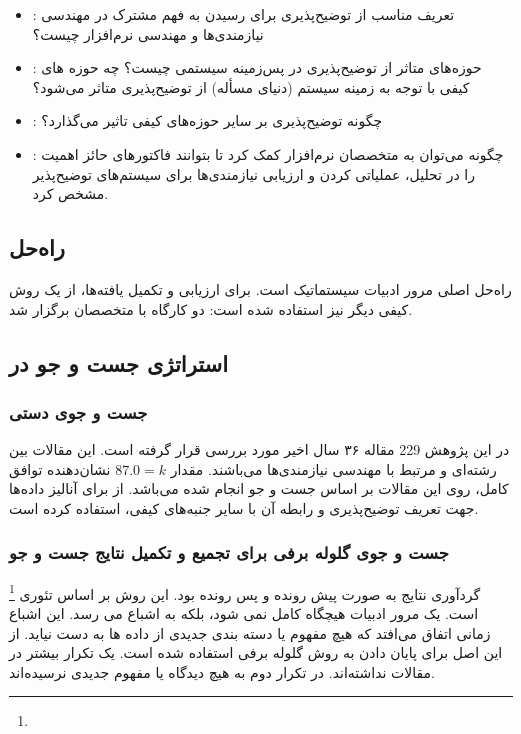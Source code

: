 \begin{itemize}
    \item {}: تعریف مناسب از توضیح‌پذیری برای رسیدن به فهم مشترک در مهندسی
    نیازمندی‌ها و مهندسی نرم‌افزار چیست؟
    \item {}: حوزه‌های متاثر از توضیح‌پذیری در پس‌زمینه سیستمی چیست؟ چه
    حوزه های کیفی با توجه به زمینه سیستم (دنیای مسأله) از توضیح‌پذیری متاثر
    می‌شود؟
    \item {}: چگونه توضیح‌پذیری بر سایر حوزه‌های کیفی تاثیر می‌گذارد؟
    \item {}: چگونه می‌توان به متخصصان نرم‌افزار کمک کرد تا بتوانند
    فاکتورهای حائز اهمیت را در تحلیل، عملیاتی کردن و ارزیابی نیازمندی‌ها برای
    سیستم‌های توضیح‌پذیر مشخص کرد.
\end{itemize}

\subsection*{راه‌حل}

راه‌حل اصلی مرور ادبیات سیستماتیک است. برای ارزیابی و تکمیل یافته‌ها، از یک روش
کیفی دیگر نیز استفاده شده است: دو کارگاه با متخصصان برگزار شد. 

\subsection{استراتژی جست و جو در }

\subsubsection{جست و جوی دستی}

در این پژوهش 229 مقاله ۳۶ سال اخیر مورد بررسی قرار گرفته است. این مقالات بین
رشته‌ای و مرتبط با مهندسی نیازمندی‌ها می‌باشند. مقدار $87.0 = k$  نشان‌دهنده
توافق کامل، روی این مقالات بر اساس جست و جو انجام شده می‌باشد. از  برای آنالیز داده‌ها جهت تعریف توضیح‌پذیری و رابطه آن با سایر جنبه‌های
کیفی، استفاده کرده است.

\subsubsection{جست و جوی گلوله برفی برای تجمیع و تکمیل نتایج جست و جو}

گردآوری نتایج به صورت پیش رونده و پس رونده بود. این روش بر اساس تئوری 
\footnote{} است. یک مرور ادبیات هیچگاه کامل نمی شود، بلکه به
اشباع می رسد. این اشباع زمانی اتفاق می‌افتد که هیچ مفهوم یا دسته بندی جدیدی از
داده ها به دست نیاید. از این اصل برای پایان دادن به روش گلوله برفی استفاده شده
است. یک تکرار بیشتر در مقالات نداشته‌اند. در تکرار دوم به هیچ دیدگاه یا مفهوم
جدیدی نرسیده‌اند.

